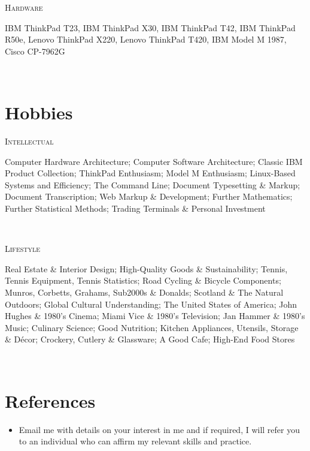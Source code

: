 \documentclass[11pt, english]{article}
\begin{document}
{\begin{minipage}[t]{.15\linewidth}
        \hfill                  
        \textsc{Hardware}    
\end{minipage}
\hfill\vline\hfill
\begin{minipage}[t]{.80\linewidth}
	IBM ThinkPad T23, IBM ThinkPad X30, IBM ThinkPad T42, IBM ThinkPad R50e, Lenovo ThinkPad X220, Lenovo ThinkPad T420, IBM Model M 1987, Cisco CP-7962G
\end{minipage}\\

\section*{Hobbies}

\begin{minipage}[t]{.15\linewidth}
        \hfill                  
        \textsc{Intellectual}    
\end{minipage}
\hfill\vline\hfill
\begin{minipage}[t]{.80\linewidth}
	Computer Hardware Architecture; Computer Software Architecture; Classic IBM Product Collection; ThinkPad Enthusiasm; Model M Enthusiasm; Linux-Based Systems and Efficiency; The Command Line; Document Typesetting \& Markup; Document Transcription; Web Markup \& Development; Further Mathematics; Further Statistical Methods; Trading Terminals \& Personal Investment
\end{minipage}\\

\begin{minipage}[t]{.15\linewidth}
        \hfill                  
	\textsc{Lifestyle}      
\end{minipage}
\hfill\vline\hfill
\begin{minipage}[t]{.80\linewidth}
	Real Estate \& Interior Design; High-Quality Goods \& Sustainability; Tennis, Tennis Equipment, Tennis Statistics; Road Cycling \& Bicycle Components; Munros, Corbetts, Grahams, Sub2000s \& Donalds; Scotland \& The Natural Outdoors; Global Cultural Understanding; The United States of America; John Hughes \& 1980's Cinema; Miami Vice \& 1980's Television; Jan Hammer \& 1980's Music; Culinary Science; Good Nutrition; Kitchen Appliances, Utensils, Storage \& D\'{e}cor; Crockery, Cutlery \& Glassware; A Good Cafe; High-End Food Stores
\end{minipage}\\

\section{References}

\begin{itemize}
\setlength\itemsep{0cm}
        \item Email me with details on your interest in me and if required, I will refer you to an individual who can affirm my relevant skills and practice.
\end{itemize}

}
\end{document}
